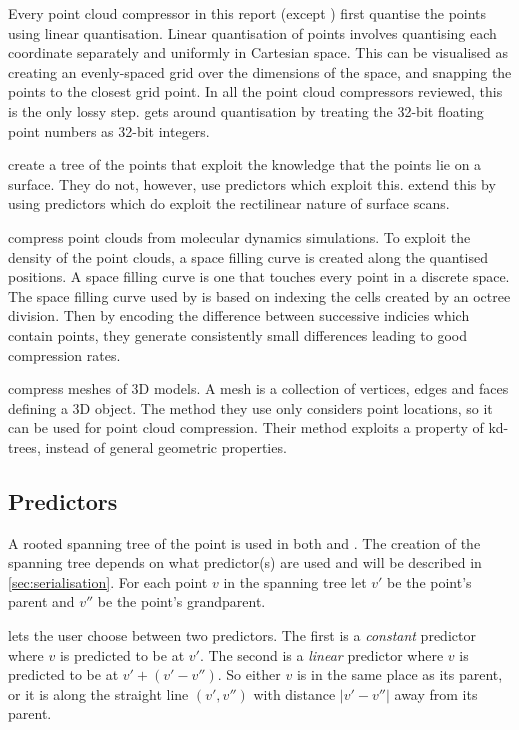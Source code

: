 \documentclass[a4paper]{report}
\begin{document}
Every point cloud compressor in this report (except \citep{chen2005lcp}) first
quantise the points using linear quantisation. Linear quantisation of points
involves quantising each coordinate separately and uniformly in Cartesian
space. This can be visualised as creating an evenly-spaced grid over the
dimensions of the space, and snapping the points to the closest grid point. In
all the point cloud compressors reviewed, this is the only lossy
step. \citep{chen2005lcp} gets around quantisation by treating the 32-bit
floating point numbers as 32-bit integers.

\citep{gumholdcomp} create a tree of the points that exploit the knowledge that
the points lie on a surface. They do not, however, use predictors which
exploit this. \citep{merrycomp} extend this by using predictors which do
exploit the rectilinear nature of surface scans.

\citep{omeltchenko2000sls} compress point clouds from molecular dynamics
simulations. To exploit the density of the point clouds, a space filling curve
is created along the quantised positions. A space filling curve is one that
touches every point in a discrete space. The space filling curve used by
\citep{omeltchenko2000sls} is based on indexing the cells created by an octree
division. Then by encoding the difference between successive indicies which
contain points, they generate consistently small differences leading to good
compression rates.

\citep{devillers2000gci} compress meshes of 3D models. A mesh is a collection
of vertices, edges and faces defining a 3D object. The method they use only
considers point locations, so it can be used for point cloud
compression. Their method exploits a property of kd-trees, instead of general
geometric properties.


\subsection{Predictors}

A rooted spanning tree of the point is used in both \citep{gumholdcomp} and
\citep{merrycomp}. The creation of the spanning tree depends on what
predictor(s) are used and will be described in \ref{sec:serialisation}. For
each point $v$ in the spanning tree let $v'$ be the point's parent and $v''$
be the point's grandparent.

\citep{gumholdcomp} lets the user choose between two predictors. The first is
a \emph{constant} predictor where $v$ is predicted to be at $v'$. The second
is a \emph{linear} predictor where $v$ is predicted to be at $v' + (v' -
v'')$. So either $v$ is in the same place as its parent, or it is along the
straight line $(v', v'')$ with distance $|v'-v''|$ away from its parent.
\end{document}
